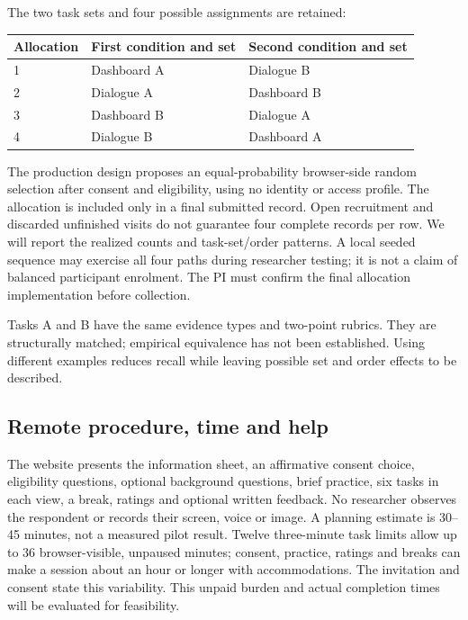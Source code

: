 \documentclass[11pt,letterpaper]{article}
\begin{document}
The two task sets and four possible assignments are retained:
\begin{center}
\begin{tabular}{lll}
\toprule
Allocation & First condition and set & Second condition and set\\
\midrule
1 & Dashboard A & Dialogue B\\
2 & Dialogue A & Dashboard B\\
3 & Dashboard B & Dialogue A\\
4 & Dialogue B & Dashboard A\\
\bottomrule
\end{tabular}
\end{center}
The production design proposes an equal-probability browser-side random selection after consent and eligibility, using no identity or access profile. The allocation is included only in a final submitted record. Open recruitment and discarded unfinished visits do not guarantee four complete records per row. We will report the realized counts and task-set/order patterns. A local seeded sequence may exercise all four paths during researcher testing; it is not a claim of balanced participant enrolment. The PI must confirm the final allocation implementation before collection.

Tasks A and B have the same evidence types and two-point rubrics. They are structurally matched; empirical equivalence has not been established. Using different examples reduces recall while leaving possible set and order effects to be described.

\subsection{Remote procedure, time and help}
The website presents the information sheet, an affirmative consent choice, eligibility questions, optional background questions, brief practice, six tasks in each view, a break, ratings and optional written feedback. No researcher observes the respondent or records their screen, voice or image. A planning estimate is 30--45 minutes, not a measured pilot result. Twelve three-minute task limits allow up to 36 browser-visible, unpaused minutes; consent, practice, ratings and breaks can make a session about an hour or longer with accommodations. The invitation and consent state this variability. This unpaid burden and actual completion times will be evaluated for feasibility.
\end{document}
